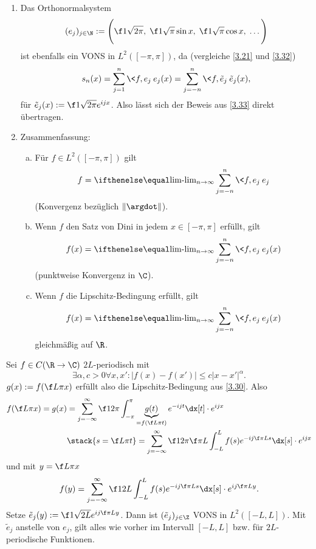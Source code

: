 \begin{nt} \label{3.34}
	\begin{enumerate}[1)]
		\item
			Das Orthonormalsystem
			\[
				(e_j)_{j\in \N} := \Bigg( \f 1{\sqrt{2\pi}}, \; \f 1{\sqrt{\pi}} \sin x,\; \f 1{\sqrt{\pi}} \cos x,\; \dotsc \Bigg)
			\]
			ist ebenfalls ein VONS in $L^2([-\pi,\pi])$, da (vergleiche \ref{3.21} und \ref{3.32})
			\[
				s_n(x)
				= \sum_{j=1}^n \<f,e_j\> e_j(x)
				= \sum_{j=-n}^n \<f,\tilde e_j\> \tilde e_j(x),
			\]
			für $\tilde e_j(x) := \f 1{\sqrt{2\pi}} e^{ijx}$.
			Also lässt sich der Beweis aus \ref{3.33} direkt übertragen.
		\item
			Zusammenfassung:
			\begin{enumerate}[a)]
				\item
					Für $f \in L^2([-\pi,\pi])$ gilt
					\[
						f = \lim_{n\to \infty} \sum_{j=-n}^n \<f,e_j\> e_j
					\]
					(Konvergenz bezüglich $\|\argdot\|$).
				\item
					Wenn $f$ den Satz von Dini in jedem $x\in [-\pi,\pi]$ erfüllt, gilt
					\[
						f(x) = \lim_{n\to \infty} \sum_{j=-n}^n \<f,e_j\> e_j(x)
					\]
					(punktweise Konvergenz in $\C$).
				\item
					Wenn $f$ die Lipschitz-Bedingung erfüllt, gilt
					\[
						f(x) = \lim_{n\to\infty} \sum_{j=-n}^n \<f,e_j\> e_j(x)
					\]
					gleichmäßig auf $\R$.
			\end{enumerate}
	\end{enumerate}
\end{nt}

\begin{nt} \label{3.35}
	Sei $f \in C(\R \to \C)$ $2L$-periodisch mit
	\[
		\exists \alpha, c > 0 \forall x,x': |f(x) - f(x')| \le c |x-x'|^\alpha.
	\]
	$g(x) := f(\f L\pi x)$ erfüllt also die Lipschitz-Bedingung aus \ref{3.30}.
	Also
	\begin{align*}
		f(\f L\pi x) = g(x) 
		&= \sum_{j=-\infty}^\infty \f 1{2\pi} \int_{-\pi}^\pi \underbrace{g(t)}_{=f(\f L\pi t)} e^{-ijt} \dx[t] \cdot e^{ijx} \\
		&\stack{s = \f L\pi t}= \sum_{j=-\infty}^\infty \f 1{2\pi} \f \pi L \int_{-L}^L f(s) e^{-ij \f \pi L s} \dx[s] \cdot e^{ijx}
	\end{align*}
	und mit $y = \f L \pi x$
	\[
		f(y) = \sum_{j=-\infty}^\infty \f 1{2L} \int_{-L}^L f(s) e^{-ij\f \pi L s} \dx[s] \cdot e^{ij \f \pi L y}.
	\]
	Setze $\tilde e_j(y) := \f 1{\sqrt{2L}} e^{ij \f \pi L y}$.
	Dann ist $(\tilde e_j)_{j\in \Z}$ VONS in $L^2([-L,L])$.
	Mit $\tilde e_j$ anstelle von $e_j$, gilt alles wie vorher im Intervall $[-L,L]$ bzw. für $2L$-periodische Funktionen.
\end{nt}


